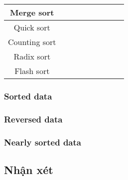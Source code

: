 \begin{table}[H]
\begin{adjustwidth}{-3cm}{-3cm}
{\begin{tabular}{|c|c|c|c|c|c|c|c|c|}
    Merge sort        &              &             &              &             &              &               &              &             \\ \hline
    Quick sort        &              &             &              &             &              &               &              &             \\ \hline
    Counting sort     &              &             &              &             &              &               &              &             \\ \hline
    Radix sort        &              &             &              &             &              &               &              &             \\ \hline
    Flash sort        &              &             &              &             &              &               &              &             \\ \hline
    \end{tabular}
    }
    \end{adjustwidth}
    \end{table}
\subsubsection{Sorted data}

\subsubsection{Reversed data}

\subsubsection{Nearly sorted data}

\subsection{Nhận xét}